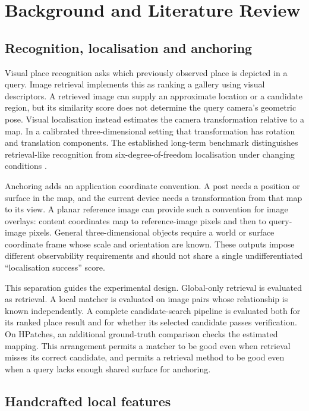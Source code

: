 \chapter{Background and Literature Review}\label{ch:background}
\section{Recognition, localisation and anchoring}
Visual place recognition asks which previously observed place is depicted in a query. Image retrieval implements this as ranking a gallery using visual descriptors. A retrieved image can supply an approximate location or a candidate region, but its similarity score does not determine the query camera's geometric pose. Visual localisation instead estimates the camera transformation relative to a map. In a calibrated three-dimensional setting that transformation has rotation and translation components. The established long-term benchmark distinguishes retrieval-like recognition from six-degree-of-freedom localisation under changing conditions \citep{sattler2018}.

Anchoring adds an application coordinate convention. A post needs a position or surface in the map, and the current device needs a transformation from that map to its view. A planar reference image can provide such a convention for image overlays: content coordinates map to reference-image pixels and then to query-image pixels. General three-dimensional objects require a world or surface coordinate frame whose scale and orientation are known. These outputs impose different observability requirements and should not share a single undifferentiated ``localisation success'' score.

This separation guides the experimental design. Global-only retrieval is evaluated as retrieval. A local matcher is evaluated on image pairs whose relationship is known independently. A complete candidate-search pipeline is evaluated both for its ranked place result and for whether its selected candidate passes verification. On HPatches, an additional ground-truth comparison checks the estimated mapping. This arrangement permits a matcher to be good even when retrieval misses its correct candidate, and permits a retrieval method to be good even when a query lacks enough shared surface for anchoring.

\section{Handcrafted local features}
